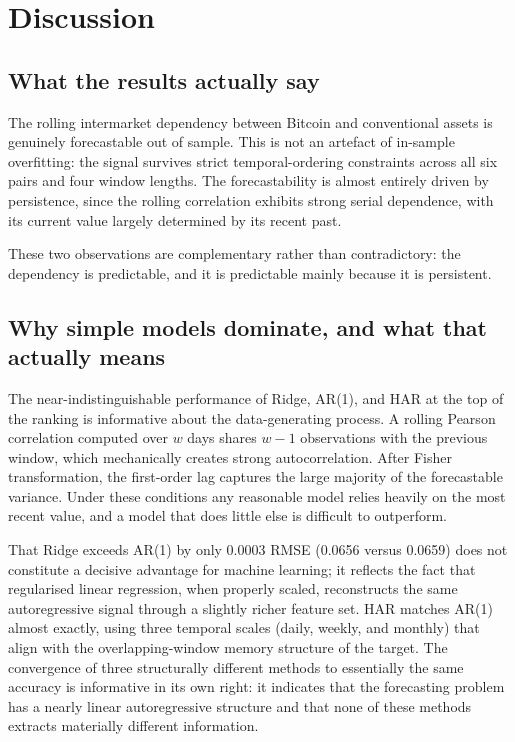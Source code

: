 \section{Discussion}
\label{sec:discussion}

\subsection{What the results actually say}

The rolling intermarket dependency between Bitcoin and conventional assets is genuinely forecastable out of sample. This is not an artefact of in-sample overfitting: the signal survives strict temporal-ordering constraints across all six pairs and four window lengths. The forecastability is almost entirely driven by persistence, since the rolling correlation exhibits strong serial dependence, with its current value largely determined by its recent past.

These two observations are complementary rather than contradictory: the dependency is predictable, and it is predictable mainly because it is persistent.

\subsection{Why simple models dominate, and what that actually means}

The near-indistinguishable performance of Ridge, AR(1), and HAR at the top of the ranking is informative about the data-generating process. A rolling Pearson correlation computed over $w$ days shares $w-1$ observations with the previous window, which mechanically creates strong autocorrelation. After Fisher transformation, the first-order lag captures the large majority of the forecastable variance. Under these conditions any reasonable model relies heavily on the most recent value, and a model that does little else is difficult to outperform.

That Ridge exceeds AR(1) by only 0.0003 RMSE (0.0656 versus 0.0659) does not constitute a decisive advantage for machine learning; it reflects the fact that regularised linear regression, when properly scaled, reconstructs the same autoregressive signal through a slightly richer feature set. HAR matches AR(1) almost exactly, using three temporal scales (daily, weekly, and monthly) that align with the overlapping-window memory structure of the target. The convergence of three structurally different methods to essentially the same accuracy is informative in its own right: it indicates that the forecasting problem has a nearly linear autoregressive structure and that none of these methods extracts materially different information.

